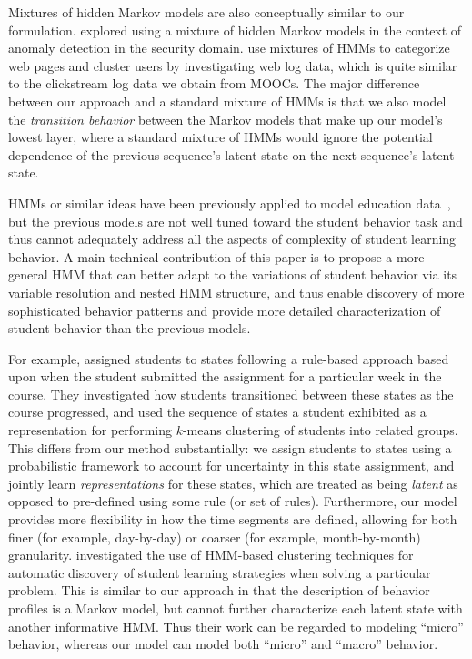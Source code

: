 Mixtures of hidden Markov models are also conceptually similar to our
formulation. \citet{Song:2009:NDSS} explored using a mixture of hidden
Markov models in the context of anomaly detection in the security domain.
\citet{Ypma:2002:Springer} use mixtures of HMMs to categorize web pages and
cluster users by investigating web log data, which is quite similar to the
clickstream log data we obtain from MOOCs. The major difference between
our approach and a standard mixture of HMMs is that we also model the
\emph{transition behavior} between the Markov models that make up our
model's lowest layer, where a standard mixture of HMMs would ignore the
potential dependence of the previous sequence's latent state on the next
sequence's latent state.

HMMs or similar ideas have been previously applied to model education
data~\cite{Shih:2010:EDM,Kizilcec:2013:LAK,Davis:2016:EDM}, but the
previous models are not well tuned toward the student behavior task and
thus cannot adequately address all the aspects of complexity of student
learning behavior.  A main technical contribution of this paper is to
propose a more general HMM that can better adapt to the variations of
student behavior via its variable resolution and nested HMM structure, and
thus enable discovery of more sophisticated behavior patterns and provide
more detailed characterization of student behavior than the previous
models.

For example, \citet{Kizilcec:2013:LAK} assigned students to states
following a rule-based approach based upon when the student submitted the
assignment for a particular week in the course. They investigated how
students transitioned between these states as the course progressed, and
used the sequence of states a student exhibited as a representation for
performing $k$-means clustering of students into related groups. This
differs from our method substantially: we assign students to states using a
probabilistic framework to account for uncertainty in this state
assignment, and jointly learn \emph{representations} for these states,
which are treated as being \emph{latent} as opposed to pre-defined using
some rule (or set of rules).  Furthermore, our model provides more
flexibility in how the time segments are defined, allowing for both finer
(for example, day-by-day) or coarser (for example, month-by-month)
granularity. \citet{Shih:2010:EDM} investigated the use of HMM-based
clustering techniques for automatic discovery of student learning
strategies when solving a particular problem.  This is similar to our
approach in that the description of behavior profiles is a Markov model,
but cannot further characterize each latent state with another informative
HMM. Thus their work can be regarded to modeling ``micro'' behavior,
whereas our model can model both ``micro'' and ``macro'' behavior.


